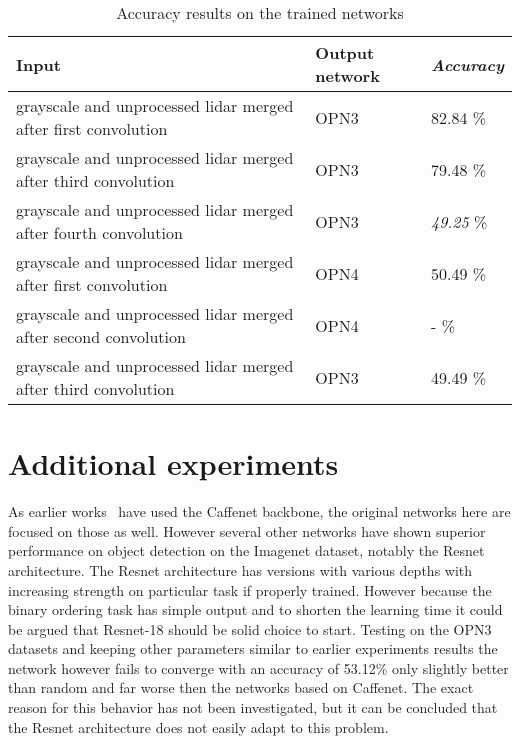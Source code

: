 \begin{table}[]
\centering
\caption{Accuracy results on the trained networks}
\label{tab:merge_results}
\begin{tabular}{|p{7cm}|p{2cm}|p{2cm}|}
\hline
\textbf{Input}                                                          & \textbf{Output network} & \textit{\textbf{Accuracy}} \\ \hline
grayscale and unprocessed lidar merged after first convolution          & OPN3                    & 82.84 \%                   \\ \hline
grayscale and unprocessed lidar merged after third convolution          & OPN3                    & 79.48 \%                   \\ \hline
grayscale and unprocessed lidar merged after fourth convolution         & OPN3                    & \textit{49.25} \%          \\ \hline
grayscale and unprocessed lidar merged after first convolution          & OPN4                    & 50.49 \%                   \\ \hline
grayscale and unprocessed lidar merged after second convolution         & OPN4                    & - \%                       \\ \hline
grayscale and unprocessed lidar merged after third convolution          & OPN3                    & 49.49 \%                   \\ \hline
\end{tabular}
\end{table}

\section{Additional experiments}
As earlier works~\cite{misra2016,lee2017} have used the Caffenet backbone, the original networks here are focused on those as well. However several other networks have shown superior performance on object detection on the Imagenet dataset, notably the Resnet architecture\cite{he2016}. The Resnet architecture has versions with various depths with increasing strength on particular task if properly trained. However because the binary ordering task has simple output and to shorten the learning time it could be argued that Resnet-18 should be solid choice to start. Testing on the OPN3 datasets and keeping other parameters similar to earlier experiments results the network however fails to converge with an accuracy of 53.12\% only slightly better than random and far worse then the networks based on Caffenet. The exact reason for this behavior has not been investigated, but it can be concluded that the Resnet architecture does not easily adapt to this problem.


